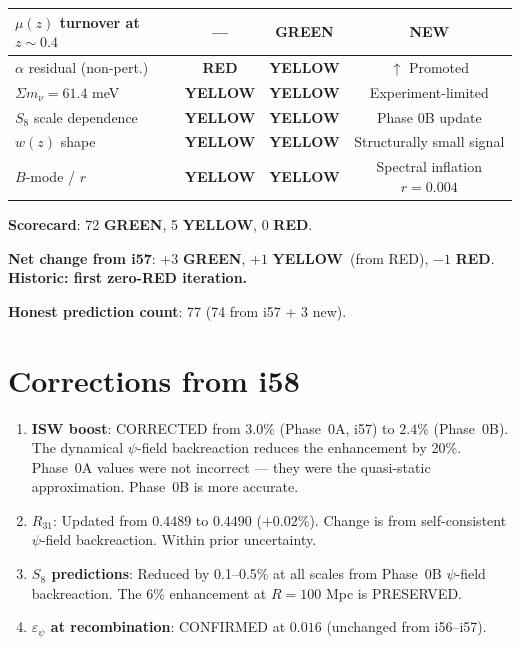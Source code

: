 \documentclass[11pt,a4paper]{article}
\newcommand{\GREEN}{\textcolor{dfdgreen}{\textbf{GREEN}}}
\newcommand{\YELLOW}{\textcolor{dfdyellow}{\textbf{YELLOW}}}
\newcommand{\RED}{\textcolor{dfdred}{\textbf{RED}}}
\begin{document}
\begin{center}
\begin{longtable}{p{5cm}ccc}
$\mu(z)$ turnover at $z \sim 0.4$ & --- & \GREEN & NEW \\
\midrule
$\alpha$ residual (non-pert.) & \RED & \YELLOW & $\uparrow$ Promoted \\
$\Sigma m_\nu = 61.4$ meV & \YELLOW & \YELLOW & Experiment-limited \\
$S_8$ scale dependence & \YELLOW & \YELLOW & Phase 0B update \\
$w(z)$ shape & \YELLOW & \YELLOW & Structurally small signal \\
$B$-mode / $r$ & \YELLOW & \YELLOW & Spectral inflation $r = 0.004$ \\
\bottomrule
\end{longtable}
\end{center}

\textbf{Scorecard}: 72 \GREEN, 5 \YELLOW, 0 \RED.

\textbf{Net change from i57}: $+3$ \GREEN, $+1$ \YELLOW\ (from RED), $-1$ \RED. \textbf{Historic: first zero-RED iteration.}

\textbf{Honest prediction count}: 77 (74 from i57 + 3 new).


\section{Corrections from i58}
\label{sec:corrections}

\begin{enumerate}
\item \textbf{ISW boost}: CORRECTED from $3.0\%$ (Phase~0A, i57) to $2.4\%$ (Phase~0B). The dynamical $\psi$-field backreaction reduces the enhancement by 20\%. Phase~0A values were not incorrect --- they were the quasi-static approximation. Phase~0B is more accurate.

\item \textbf{$R_{31}$}: Updated from $0.4489$ to $0.4490$ ($+0.02\%$). Change is from self-consistent $\psi$-field backreaction. Within prior uncertainty.

\item \textbf{$S_8$ predictions}: Reduced by 0.1--0.5\% at all scales from Phase~0B $\psi$-field backreaction. The 6\% enhancement at $R = 100$ Mpc is PRESERVED.

\item \textbf{$\varepsilon_\psi$ at recombination}: CONFIRMED at $0.016$ (unchanged from i56--i57).
\end{enumerate}
\end{document}
